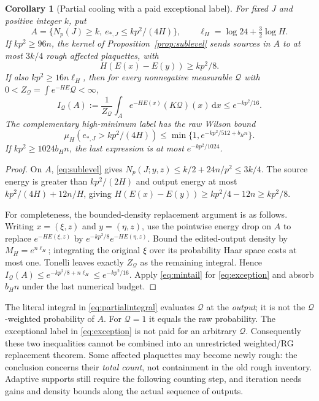 \documentclass[11pt]{article}
\newtheorem{corollary}[theorem]{Corollary}
\theoremstyle{remark}
\newcommand{\dd}{\,\mathrm d}
\begin{document}
\begin{corollary}[Partial cooling with a paid exceptional label]
\label{cor:partialcooling}
For fixed $J$ and positive integer $k$, put
\[
 A=\{N_p(J)\ge k,\ e_{*,J}\le kp^2/(4H)\},\qquad
 \ell_H=\log24+\tfrac32\log H.
\]
If $kp^2\ge96n$, the kernel of Proposition~\ref{prop:sublevel} sends
sources in $A$ to at most $3k/4$ rough affected plaquettes, with
\begin{equation}
 H(E(x)-E(y))\ge kp^2/8.
 \label{eq:partialgain}
\end{equation}
If also $kp^2\ge16n\ell_H$, then for every nonnegative measurable
$\mathcal Q$ with $0<Z_{\mathcal Q}=\int e^{-HE}\mathcal Q<\infty$,
\begin{equation}
 I_{\mathcal Q}(A):=\frac1{Z_{\mathcal Q}}
       \int_A e^{-HE(x)}(K\mathcal Q)(x)\dd x
 \le e^{-kp^2/16}.
 \label{eq:partialintegral}
\end{equation}
The complementary high-minimum label has the \emph{raw Wilson} bound
\begin{equation}
 \mu_H(e_{*,J}>kp^2/(4H))
 \le\min\{1,e^{-kp^2/512+b_Hn}\}.
 \label{eq:exception}
\end{equation}
If $kp^2\ge1024b_Hn$, the last expression is at most
$e^{-kp^2/1024}$.
\end{corollary}
\begin{proof}
On $A$, \eqref{eq:sublevel} gives
$N_p(J;y,z)\le k/2+24n/p^2\le3k/4$. The source energy is greater than
$kp^2/(2H)$ and output energy at most $kp^2/(4H)+12n/H$, giving
$H(E(x)-E(y))\ge kp^2/4-12n\ge kp^2/8$.

For completeness, the bounded-density replacement argument is as follows.
Writing $x=(\xi,z)$ and $y=(\eta,z)$, use the pointwise energy drop on
$A$ to replace $e^{-HE(\xi,z)}$ by
$e^{-kp^2/8}e^{-HE(\eta,z)}$. Bound the edited-output density by
$M_H=e^{n\ell_H}$; integrating the original $\xi$ over its probability
Haar space costs at most one. Tonelli leaves exactly
$Z_{\mathcal Q}$ as the remaining integral. Hence
$I_{\mathcal Q}(A)\le e^{-kp^2/8+n\ell_H}\le e^{-kp^2/16}$.
Apply \eqref{eq:mintail} for \eqref{eq:exception} and absorb $b_Hn$
under the last numerical budget.
\end{proof}
The literal integral in \eqref{eq:partialintegral} evaluates $\mathcal Q$
at the \emph{output}; it is not the $\mathcal Q$-weighted probability of
$A$. For $\mathcal Q=1$ it equals the raw probability. The exceptional
label in \eqref{eq:exception} is not paid for an arbitrary $\mathcal Q$.
Consequently these two inequalities cannot be combined into an
unrestricted weighted/RG replacement theorem. Some affected plaquettes
may become newly rough: the conclusion concerns their \emph{total count},
not containment in the old rough inventory. Adaptive supports still
require the following counting step, and iteration needs gains and density
bounds along the actual sequence of outputs.
\end{document}
